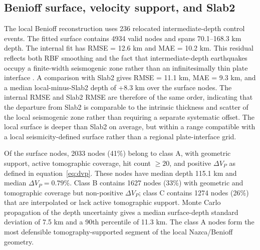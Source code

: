 \documentclass[review,authoryear]{elsarticle}
\begin{document}
\subsection{Benioff surface, velocity support, and Slab2}
The local Benioff reconstruction uses 236 relocated intermediate-depth control events. The fitted surface contains 4934 valid nodes and spans 70.1--168.3 km depth. The internal fit has RMSE = 12.6 km and MAE = 10.2 km. This residual reflects both RBF smoothing and the fact that intermediate-depth earthquakes occupy a finite-width seismogenic zone rather than an infinitesimally thin plate interface \citep{Hacker2003,vanKeken2011}. A comparison with Slab2 gives RMSE = 11.1 km, MAE = 9.3 km, and a median local-minus-Slab2 depth of +8.3 km over the surface nodes. The internal RMSE and Slab2 RMSE are therefore of the same order, indicating that the departure from Slab2 is comparable to the intrinsic thickness and scatter of the local seismogenic zone rather than requiring a separate systematic offset. The local surface is deeper than Slab2 on average, but within a range compatible with a local seismicity-defined surface rather than a regional plate-interface grid.

Of the surface nodes, 2033 nodes (41\%) belong to class A, with geometric support, active tomographic coverage, hit count $\geq20$, and positive $\Delta V_P$ as defined in equation~\ref{eq:dvp}. These nodes have median depth 115.1 km and median $\Delta V_P=0.79\%$. Class B contains 1627 nodes (33\%) with geometric and tomographic coverage but non-positive $\Delta V_P$; class C contains 1274 nodes (26\%) that are interpolated or lack active tomographic support. Monte Carlo propagation of the depth uncertainty gives a median surface-depth standard deviation of 7.5 km and a 90th percentile of 11.3 km. The class A nodes form the most defensible tomography-supported segment of the local Nazca/Benioff geometry.
\end{document}

